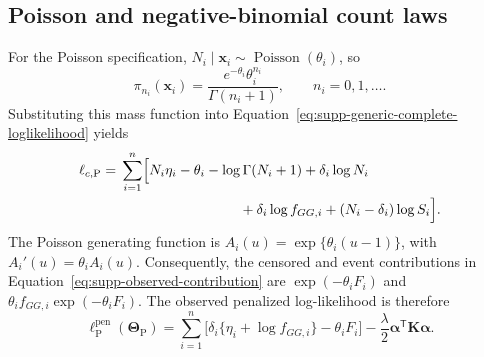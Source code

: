 \documentclass[11pt]{article}
\begin{document}
\subsection{Poisson and negative-binomial count laws}

For the Poisson specification, $N_i\mid\bm{x}_i\sim\operatorname{Poisson}(\theta_i)$, so
\begin{equation}
\pi_{n_i}(\bm{x}_i)
=\frac{e^{-\theta_i}\theta_i^{n_i}}{\Gamma(n_i+1)},
\qquad n_i=0,1,\ldots.
\label{eq:supp-poisson-count-pmf}
\end{equation}
Substituting this mass function into Equation~\eqref{eq:supp-generic-complete-loglikelihood} yields
\begin{equation}
\begin{aligned}
\ell_{c,\mathrm P}
={}&\sum_{i=1}^{n}\Bigl[
N_i\eta_i-\theta_i-\log\Gamma(N_i+1)+\delta_i\log N_i\\
&\hspace{30mm}+\delta_i\log f_{GG,i}+(N_i-\delta_i)\log S_i
\Bigr].
\end{aligned}
\label{eq:supp-poisson-complete-loglikelihood}
\end{equation}
The Poisson generating function is $A_i(u)=\exp\{\theta_i(u-1)\}$, with $A_i'(u)=\theta_i A_i(u)$. Consequently, the censored and event contributions in Equation~\eqref{eq:supp-observed-contribution} are $\exp(-\theta_iF_i)$ and $\theta_i f_{GG,i}\exp(-\theta_iF_i)$. The observed penalized log-likelihood is therefore
\begin{equation}
\ell_{\mathrm P}^{\mathrm{pen}}(\bm\Theta_{\mathrm P})
=\sum_{i=1}^{n}\bigl[\delta_i\{\eta_i+\log f_{GG,i}\}-\theta_iF_i\bigr]
-\frac{\lambda}{2}\bm\alpha^{\mathsf T}\bm K\bm\alpha.
\label{eq:supp-poisson-observed-loglikelihood}
\end{equation}
\end{document}
